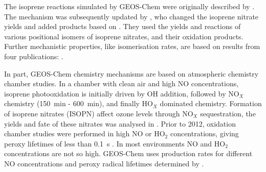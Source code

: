     \label{Model:GC:Isop}
    
    The isoprene reactions simulated by GEOS-Chem were originally described by \textcite{Horowitz1998}.
    The mechanism was subsequently updated by \textcite{Mao2013}, who changed the isoprene nitrate yields and added products based on \textcite{Paulot2009a, Paulot2009b}.
    They used the yields and reactions of various positional isomers of isoprene nitrates, and their oxidation products. %
    Further mechanistic properties, like isomerisation rates, are based on results from four publications: \textcite{Peeters2009, Peeters2010, Crounse2011, Crounse2012}.
    
    In part, GEOS-Chem chemistry mechanisms are based on atmospheric chemistry chamber studies.
    In a chamber with clean air and high NO concentrations, isoprene photooxidation is initially driven by OH addition, followed by NO$_X$ chemistry (150~min - 600~min), and finally HO$_X$ dominated chemistry.
    Formation of isoprene nitrates (ISOPN) affect ozone levels through NO$_X$ sequestration, the yields and fate of these nitrates was analysed in \textcite{Paulot2009a}.
    Prior to 2012, oxidation chamber studies were performed in high NO or HO$_2$ concentrations, giving peroxy lifetimes of less than 0.1~s \parencite{Crounse2012, Wolfe2012}.
    In most environments NO and HO$_2$ concentrations are not so high.
    GEOS-Chem uses production rates for different NO concentrations and peroxy radical lifetimes determined by \textcite{Mao2013}.
    
